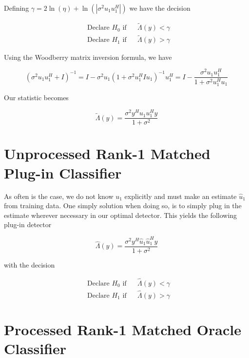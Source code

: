 \documentclass[english]{article}
\begin{document}
Defining $\gamma = 2\ln(\eta)+\ln(|\sigma^2u_1u_1^H|)$ we have the decision

\begin{equation}
\begin{aligned}
&\text{Declare } H_0 \text{ if}
&& \tilde{\Lambda}(y) < \gamma\\
& \text{Declare } H_1 \text{ if}
&& \tilde{\Lambda}(y) > \gamma\
\end{aligned}
\end{equation}

Using the Woodberry matrix inversion formula, we have

\begin{equation}
\left(\sigma^2u_1u_1^H+I\right)^{-1}= I - \sigma^2u_1(1+\sigma^2u_1^HIu_1)^{-1}u_1^H=I-\frac{\sigma^2u_1u_1^H}{1+\sigma^2u_1^Hu_1}
\end{equation}

Our statistic becomes

\begin{equation}\label{eq:unproc oracle}
\boxed{\tilde{\Lambda}(y)=\frac{\sigma^2y^Hu_1u_1^Hy}{1+\sigma^2}}
\end{equation}

\section*{Unprocessed Rank-1 Matched Plug-in Classifier}

As often is the case, we do not know $u_1$ explicitly and must make an estimate $\hat{u}_1$ from training data. One simply solution when doing so, is to simply plug in the estimate wherever necessary in our optimal detector. This yields the following plug-in detector

\begin{equation}\label{eq:unproc plugin}
\boxed{\hat{\Lambda}(y)=\frac{\sigma^2y^H\hat{u}_1\hat{u}_1^Hy}{1+\sigma^2}}
\end{equation}

with the decision

\begin{equation}
\begin{aligned}
&\text{Declare } H_0 \text{ if}
&& \hat{\Lambda}(y) < \gamma\\
& \text{Declare } H_1 \text{ if}
&& \hat{\Lambda}(y) > \gamma\
\end{aligned}
\end{equation}

\section*{Processed Rank-1 Matched Oracle Classifier}
\end{document}
